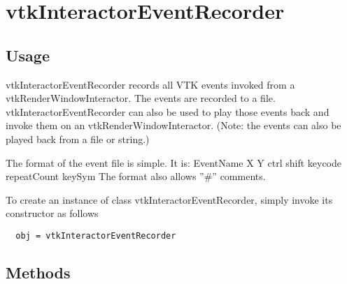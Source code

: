 \section{vtkInteractorEventRecorder}

\subsection{Usage}

 vtkInteractorEventRecorder records all VTK events invoked from a
 vtkRenderWindowInteractor. The events are recorded to a
 file. vtkInteractorEventRecorder can also be used to play those events
 back and invoke them on an vtkRenderWindowInteractor. (Note: the events
 can also be played back from a file or string.)

 The format of the event file is simple. It is:
  EventName X Y ctrl shift keycode repeatCount keySym
 The format also allows ''\#'' comments.

To create an instance of class vtkInteractorEventRecorder, simply
invoke its constructor as follows
\begin{verbatim}
  obj = vtkInteractorEventRecorder
\end{verbatim}
\subsection{Methods}

